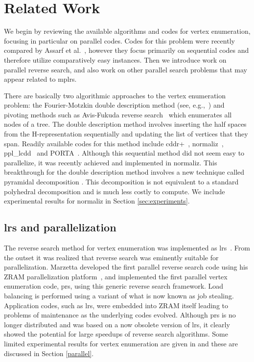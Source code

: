 \documentclass[a4paper,11pt]{article}   \usepackage{authblk} \usepackage[top=1.9cm,bottom=1.9cm,left=1.9cm,right=1.9cm]{geometry}
\newcommand{\progname}{\textsf}
\newcommand{\zram}{\progname{ZRAM}\xspace}
\newcommand{\prs}{\progname{prs}\xspace}
\newcommand{\lrs}{\progname{lrs}\xspace}
\newcommand{\mplrs}{\progname{mplrs}\xspace}
\newcommand{\norm}{\progname{normaliz}\xspace}
\newcommand{\cdd}{\progname{cddr+}\xspace}
\newcommand{\ppl}{\progname{ppl\_lcdd}\xspace}
\begin{document}
\section{Related Work}
\label{sec:relwork}

We begin by reviewing the available algorithms and codes for vertex enumeration, focusing in particular on
parallel codes.  Codes for this problem were recently compared by Assarf et al.~\cite{polymake17},
however they focus primarily on sequential codes and therefore utilize comparatively
easy instances.  Then we introduce work on parallel reverse search, and also work on other parallel
search problems that may appear related to \mplrs.

There are basically two algorithmic approaches to the vertex enumeration problem: the Fourier-Motzkin double description method
(see, e.g.,~\cite{Ziegler})
and pivoting methods such as Avis-Fukuda reverse search~\cite{AF92} which enumerates all nodes of a tree.
The double description method involves inserting the half spaces from the H-representation sequentially and
updating the list of vertices that they span. 
Readily available codes for this method include \cdd~\cite{cdd},  
\norm~\cite{norm}, \ppl~\cite{ppl} and PORTA~\cite{porta}.
Although this sequential method did not seem easy to parallelize, it was recently achieved
and implemented in \norm. This breakthrough for the double description method involves
a new technique called pyramidal decomposition \cite{BIS16}. This decomposition is not equivalent to a standard
polyhedral decomposition and is much less costly to compute. We include experimental results
for \norm in Section \ref{sec:experiments}.

\subsection{\lrs and parallelization}

The reverse search method for vertex enumeration was implemented as \lrs~\cite{lrs,lrs2}.
From the outset it was realized that reverse search was eminently suitable for parallelization.
Marzetta developed the first parallel reverse search code using his \zram parallelization
platform~\cite{BMFN99,ZRAMthesis}, and implemented the first parallel vertex enumeration code, \prs, using
this generic reverse search framework. 
Load balancing is performed using a variant of what is now known as job stealing.
Application codes, such as \lrs, were embedded into \zram itself leading
to problems of maintenance as the underlying codes evolved.                     
Although \prs is no longer distributed and was based on a now obsolete version of \lrs,
it clearly showed the potential for large speedups of reverse search algorithms. 
Some limited experimental results for vertex enumeration are given in \cite{BMFN99} 
and these are discussed in Section \ref{parallel}.
\end{document}
